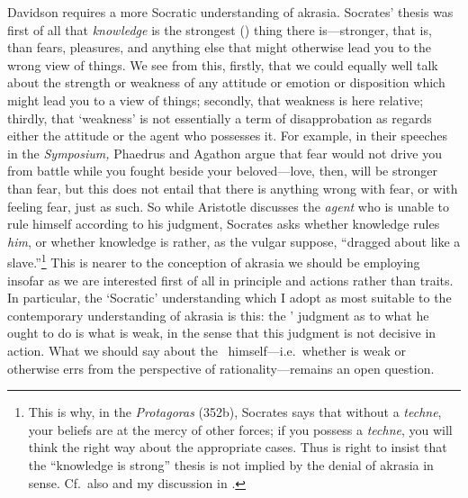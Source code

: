 \documentclass[11pt,letterpaper,oneside]{amsart}
\begin{document}
Davidson requires a more Socratic understanding of akrasia. Socrates' thesis was first of all that \emph{knowledge} is the strongest () thing there is---stronger, that is, than fears, pleasures, and anything else that might otherwise lead you to the wrong view of things. We see from this, firstly, that we could equally well talk about the strength or weakness of any attitude or emotion or disposition which might lead you to a view of things; secondly, that weakness is here relative; thirdly, that `weakness' is not essentially a term of disapprobation as regards either the attitude or the agent who possesses it. For example, in their speeches in the \emph{Symposium,} Phaedrus and Agathon argue that fear would not drive you from battle while you fought beside your beloved---love, then, will be stronger than fear, but this does not entail that there is anything wrong with fear, or with feeling fear, just as such. So while Aristotle discusses the \emph{agent} who is unable to rule himself according to his judgment, Socrates asks whether knowledge rules \emph{him}, or whether knowledge is rather, as the vulgar suppose, ``dragged about like a slave.''\footnote{This is why, in the \emph{Protagoras} (352b), Socrates says that without a \emph{techne}, your beliefs are at the mercy of other forces; if you possess a \emph{techne}, you will think the right way about the appropriate cases. Thus \citet{penner1997ssk} is right to insist that the ``knowledge is strong'' thesis is not implied by the denial of akrasia in  sense. Cf.\ also \citet[pp.\ 257--8]{allen1960sp} and my discussion in \citet{ritchiesocrates}.} This is nearer to the conception of akrasia we should be employing insofar as we are interested first of all in principle and actions rather than traits. In particular, the `Socratic' understanding which I adopt as most suitable to the contemporary understanding of akrasia is this: the \ak' judgment as to what he ought to do is what is weak, in the sense that this judgment is not decisive in action. What we should say about the \ak\ himself---i.e.\ whether  is weak or otherwise errs from the perspective of rationality---remains an open question.
\end{document}
